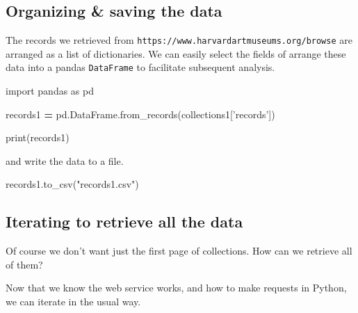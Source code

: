 \documentclass[]{book}
\newenvironment{Shaded}{\begin{snugshade}}{\end{snugshade}}
\newcommand{\BuiltInTok}[1]{#1}
\newcommand{\ImportTok}[1]{#1}
\newcommand{\NormalTok}[1]{#1}
\newcommand{\OperatorTok}[1]{\textcolor[rgb]{0.81,0.36,0.00}{\textbf{#1}}}
\newcommand{\StringTok}[1]{\textcolor[rgb]{0.31,0.60,0.02}{#1}}
\begin{document}
\hypertarget{organizing-saving-the-data}{%
\subsection{Organizing \& saving the data}\label{organizing-saving-the-data}}

The records we retrieved from
\texttt{https://www.harvardartmuseums.org/browse} are arranged as a list of
dictionaries. We can easily select the fields of arrange these data
into a pandas \texttt{DataFrame} to facilitate subsequent analysis.

\begin{Shaded}
\begin{Highlighting}[]
\ImportTok{import}\NormalTok{ pandas }\ImportTok{as}\NormalTok{ pd}
\end{Highlighting}
\end{Shaded}

\begin{Shaded}
\begin{Highlighting}[]
\NormalTok{records1 }\OperatorTok{=}\NormalTok{ pd.DataFrame.from_records(collections1[}\StringTok{'records'}\NormalTok{])}
\end{Highlighting}
\end{Shaded}

\begin{Shaded}
\begin{Highlighting}[]
\BuiltInTok{print}\NormalTok{(records1)}
\end{Highlighting}
\end{Shaded}

and write the data to a file.

\begin{Shaded}
\begin{Highlighting}[]
\NormalTok{records1.to_csv(}\StringTok{"records1.csv"}\NormalTok{)}
\end{Highlighting}
\end{Shaded}

\hypertarget{iterating-to-retrieve-all-the-data}{%
\subsection{Iterating to retrieve all the data}\label{iterating-to-retrieve-all-the-data}}

Of course we don't want just the first page of collections. How can we
retrieve all of them?

Now that we know the web service works, and how to make requests in
Python, we can iterate in the usual way.
\end{document}

